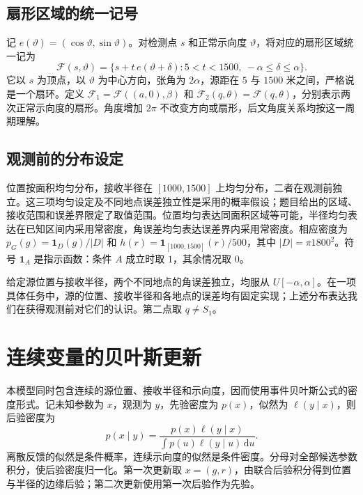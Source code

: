 \documentclass[UTF8,a4paper,zihao=-4,fontset=none]{ctexart}
\numberwithin{equation}{section}
\newcommand{\ind}{\mathbf 1}
\newcommand{\dd}{\,\mathrm d}
\begin{document}
\subsection{扇形区域的统一记号}
记 \(e(\vartheta)=(\cos\vartheta,\sin\vartheta)\)。对检测点 \(s\) 和正常示向度 \(\vartheta\)，将对应的扇形区域统一记为
\begin{equation}\label{eq:sector}
\mathcal F(s,\vartheta)=\{s+t\,e(\vartheta+\delta):5<t<1500,\ -\alpha\le\delta\le\alpha\}.
\end{equation}
它以 \(s\) 为顶点，以 \(\vartheta\) 为中心方向，张角为 \(2\alpha\)，源距在 \(5\) 与 \(1500\) 米之间，严格说是一个扇环。定义 \(\mathcal F_1=\mathcal F((a,0),\beta)\) 和 \(\mathcal F_2(q,\theta)=\mathcal F(q,\theta)\)，分别表示两次正常示向度的扇形。角度增加 \(2\pi\) 不改变方向或扇形，后文角度关系均按这一周期理解。

\subsection{观测前的分布设定}
位置按面积均匀分布，接收半径在 \([1000,1500]\) 上均匀分布，二者在观测前独立。这三项均匀设定及不同地点误差独立性是采用的概率假设；题目给出的区域、接收范围和误差界限定了取值范围。位置均匀表达同面积区域等可能，半径均匀表达在已知区间内采用常密度，角误差均匀表达误差界内采用常密度。相应密度为 \(p_G(g)=\ind_D(g)/|D|\) 和 \(h(r)=\ind_{[1000,1500]}(r)/500\)，其中 \(|D|=\pi1800^2\)。符号 \(\ind_A\) 是指示函数：条件 \(A\) 成立时取 \(1\)，其余情况取 \(0\)。

给定源位置与接收半径，两个不同地点的角误差独立，均服从 \(U[-\alpha,\alpha]\)。在一项具体任务中，源的位置、接收半径和各地点的误差均有固定实现；上述分布表达我们在获得观测前对它们的认识。第二点取 \(q\ne S_1\)。

\section{连续变量的贝叶斯更新}
本模型同时包含连续的源位置、接收半径和示向度，因而使用事件贝叶斯公式的密度形式。记未知参数为 \(x\)，观测为 \(y\)，先验密度为 \(p(x)\)，似然为 \(\ell(y\mid x)\)，则后验密度为
\begin{equation}\label{eq:bayes}
p(x\mid y)=\frac{p(x)\ell(y\mid x)}{\int p(u)\ell(y\mid u)\dd u}.
\end{equation}
离散反馈的似然是条件概率，连续示向度的似然是条件密度。分母对全部候选参数积分，使后验密度归一化。第一次更新取 \(x=(g,r)\)，由联合后验积分得到位置与半径的边缘后验；第二次更新使用第一次后验作为先验。
\end{document}
